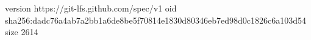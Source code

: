 version https://git-lfs.github.com/spec/v1
oid sha256:dadc76a4ab7a2bb1a6de8be5f70814e1830d80346eb7ed98d0c1826c6a103d54
size 2614
